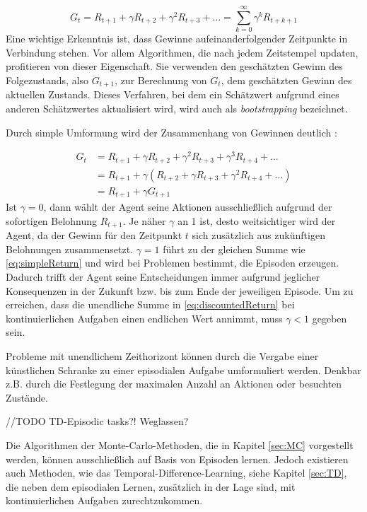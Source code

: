 \begin{equation}\label{eq:discountedReturn}
    G_t = R_{t+1} + \gamma R_{t+2} + \gamma^2 R_{t+3} + \dots  = \sum_{k=0}^\infty{\gamma^k R_{t+k+1}}
\end{equation}
Eine wichtige Erkenntnis ist, dass Gewinne aufeinanderfolgender Zeitpunkte in Verbindung stehen. Vor allem Algorithmen, die nach jedem Zeitstempel updaten, profitieren von dieser Eigenschaft. Sie verwenden den geschätzten Gewinn des Folgezustands, also $G_{t+1}$, zur Berechnung von $G_t$, dem geschätzten Gewinn des aktuellen Zustands. Dieses Verfahren, bei dem ein Schätzwert aufgrund eines anderen Schätzwertes aktualisiert wird, wird auch als \textit{bootstrapping} bezeichnet.  
\par 
Durch simple Umformung wird der Zusammenhang von Gewinnen deutlich \cite[S.55]{Sutton1998}:

\begin{equation}\label{eq:successiveReturn}
    \begin{aligned}
    G_t &= R_{t+1} + \gamma R_{t+2} + \gamma^2 R_{t+3} + \gamma^3 R_{t+4} + \dots \\
    &= R_{t+1} + \gamma (R_{t+2} + \gamma R_{t+3} + \gamma^2 R_{t+4} + \dots)  \\
   & = R_{t+1} + \gamma G_{t+1}
    \end{aligned}
\end{equation}
Ist $\gamma = 0$, dann wählt der Agent seine Aktionen ausschließlich aufgrund der sofortigen Belohnung $R_{t+1}$. Je näher $\gamma$ an 1 ist, desto \glqq weitsichtiger\grqq{} wird der Agent, da der Gewinn für den Zeitpunkt $t$ sich zusätzlich aus zukünftigen Belohnungen zusammensetzt. $\gamma = 1$ führt zu der gleichen Summe wie \eqref{eq:simpleReturn} und wird bei Problemen bestimmt, die Episoden erzeugen. Dadurch trifft der Agent seine Entscheidungen immer aufgrund jeglicher Konsequenzen in der Zukunft bzw. bis zum Ende der jeweiligen Episode. Um zu erreichen, dass die unendliche Summe in \eqref{eq:discountedReturn} bei kontinuierlichen Aufgaben einen endlichen Wert annimmt, muss $\gamma < 1$ gegeben sein.
\par 
Probleme mit unendlichem Zeithorizont können durch die Vergabe einer künstlichen Schranke zu einer episodialen Aufgabe umformuliert werden. Denkbar z.B. durch die Festlegung der maximalen Anzahl an Aktionen oder besuchten Zustände. 
\par 
//TODO TD-Episodic tasks?! Weglassen?
\par
Die Algorithmen der Monte-Carlo-Methoden, die in Kapitel \ref{sec:MC} vorgestellt werden, können ausschließlich auf Basis von Episoden lernen. Jedoch existieren auch Methoden, wie das Temporal-Difference-Learning, siehe Kapitel \ref{sec:TD}, die neben dem episodialen Lernen, zusätzlich in der Lage sind, mit kontinuierlichen Aufgaben zurechtzukommen. 